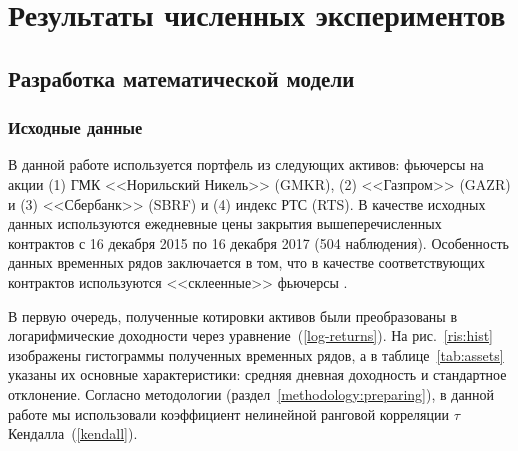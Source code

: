 \section{Результаты численных экспериментов}
\label{section:results}

\subsection{Разработка математической модели}
\label{results:calibration}


\subsubsection{Исходные данные}

В данной работе используется портфель из следующих активов: фьючерсы на акции (1) ГМК <<Норильский Никель>> (GMKR), (2) <<Газпром>> (GAZR) и (3) <<Сбербанк>> (SBRF) и (4) индекс РТС (RTS). 
В качестве исходных данных используются ежедневные цены закрытия вышеперечисленных контрактов с 16 декабря 2015 по 16 декабря 2017 (504 наблюдения). %
Особенность данных временных рядов заключается в том, что в качестве соответствующих контрактов используются <<склеенные>>   фьючерсы \cite{Masteika2012}.

В первую очередь, полученные котировки активов были преобразованы в логарифмические доходности через уравнение~(\ref{log-returns}).
На рис.~\ref{ris:hist} изображены гистограммы полученных временных рядов, а в таблице~\ref{tab:assets} указаны их основные характеристики: средняя дневная доходность и стандартное отклонение. Согласно методологии (раздел~\ref{methodology:preparing}), в данной работе мы использовали коэффициент нелинейной ранговой корреляции $\tau$ Кендалла~(\ref{kendall}).

